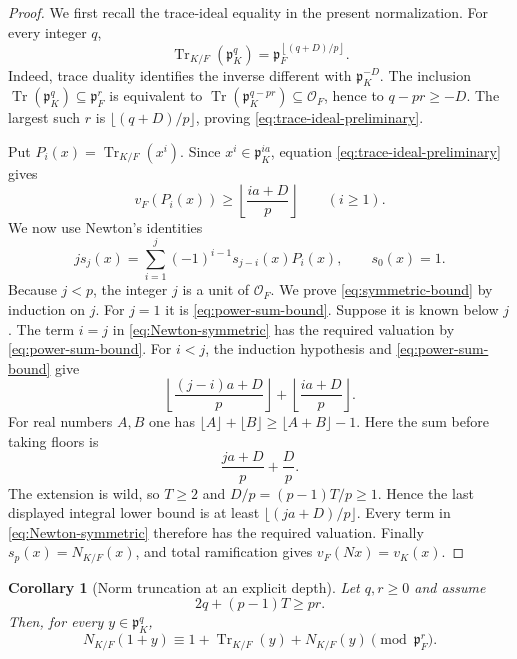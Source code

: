 \documentclass[11pt]{amsart}
\newtheorem{corollary}[theorem]{Corollary}
\theoremstyle{definition}
\theoremstyle{remark}
\newcommand{\cO}{\mathcal O}
\newcommand{\p}{\mathfrak p}
\newcommand{\Tr}{\operatorname{Tr}}
\begin{document}
\begin{proof}
We first recall the trace-ideal equality in the present normalization.
For every integer $q$,
\begin{equation}\label{eq:trace-ideal-preliminary}
 \Tr_{K/F}(\p_K^q)
 =\p_F^{\left\lfloor(q+D)/p\right\rfloor}.
\end{equation}
Indeed, trace duality identifies the inverse different with
$\p_K^{-D}$.  The inclusion
$\Tr(\p_K^q)\subseteq\p_F^r$ is equivalent to
$\Tr(\p_K^{q-pr})\subseteq\cO_F$, hence to
$q-pr\ge-D$.  The largest such $r$ is
$\lfloor(q+D)/p\rfloor$, proving
\eqref{eq:trace-ideal-preliminary}.

Put $P_i(x)=\Tr_{K/F}(x^i)$.  Since
$x^i\in\p_K^{ia}$, equation
\eqref{eq:trace-ideal-preliminary} gives
\begin{equation}\label{eq:power-sum-bound}
 v_F(P_i(x))\ge
 \left\lfloor\frac{ia+D}{p}\right\rfloor
 \qquad(i\ge1).
\end{equation}
We now use Newton's identities
\begin{equation}\label{eq:Newton-symmetric}
 j s_j(x)=\sum_{i=1}^j(-1)^{i-1}s_{j-i}(x)P_i(x),
 \qquad s_0(x)=1.
\end{equation}
Because $j<p$, the integer $j$ is a unit of $\cO_F$.  We prove
\eqref{eq:symmetric-bound} by induction on $j$.  For $j=1$ it is
\eqref{eq:power-sum-bound}.  Suppose it is known below $j$.
The term $i=j$ in \eqref{eq:Newton-symmetric} has the required
valuation by \eqref{eq:power-sum-bound}.  For $i<j$, the induction
hypothesis and \eqref{eq:power-sum-bound} give
\[
 \left\lfloor\frac{(j-i)a+D}{p}\right\rfloor
 +\left\lfloor\frac{ia+D}{p}\right\rfloor.
\]
For real numbers $A,B$ one has
$\lfloor A\rfloor+\lfloor B\rfloor\ge\lfloor A+B\rfloor-1$.
Here the sum before taking floors is
\[
 \frac{ja+D}{p}+\frac Dp.
\]
The extension is wild, so $T\ge2$ and
$D/p=(p-1)T/p\ge1$.  Hence the last displayed integral lower bound is
at least $\lfloor(ja+D)/p\rfloor$.  Every term in
\eqref{eq:Newton-symmetric} therefore has the required valuation.
Finally $s_p(x)=N_{K/F}(x)$, and total ramification gives
$v_F(Nx)=v_K(x)$.
\end{proof}

\begin{corollary}[Norm truncation at an explicit depth]
\label{cor:wild-norm-truncation}
Let $q,r\ge0$ and assume
\begin{equation}\label{eq:wild-norm-truncation-condition}
 2q+(p-1)T\ge pr.
\end{equation}
Then, for every $y\in\p_K^q$,
\begin{equation}\label{eq:wild-norm-truncation}
 N_{K/F}(1+y)
 \equiv1+\Tr_{K/F}(y)+N_{K/F}(y)
 \pmod{\p_F^r}.
\end{equation}
\end{corollary}
\end{document}
